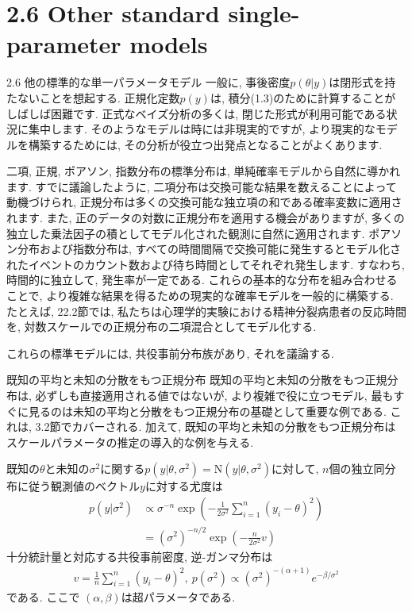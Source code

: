 \documentclass[10pt,dvipdfmx,a4]{beamer}
\newcommand{\eqn}[1]{\begin{align*}#1\end{align*}}
\begin{document}
\section{2.6 Other standard single-parameter models}
\begin{frame}{2.6 他の標準的な単一パラメータモデル}
一般に, 事後密度$p(\theta|y)$は閉形式を持たないことを想起する.
正規化定数$p(y)$は, 積分(1.3)のために計算することがしばしば困難です.
正式なベイズ分析の多くは, 閉じた形式が利用可能である状況に集中します.
そのようなモデルは時には非現実的ですが, より現実的なモデルを構築するためには, その分析が役立つ出発点となることがよくあります.

二項, 正規, ポアソン, 指数分布の標準分布は, 単純確率モデルから自然に導かれます.
すでに議論したように, 二項分布は交換可能な結果を数えることによって動機づけられ, 正規分布は多くの交換可能な独立項の和である確率変数に適用されます.
また, 正のデータの対数に正規分布を適用する機会がありますが, 多くの独立した乗法因子の積としてモデル化された観測に自然に適用されます.
ポアソン分布および指数分布は, すべての時間間隔で交換可能に発生するとモデル化されたイベントのカウント数および待ち時間としてそれぞれ発生します.
すなわち, 時間的に独立して, 発生率が一定である.
これらの基本的な分布を組み合わせることで, より複雑な結果を得るための現実的な確率モデルを一般的に構築する.
たとえば, 22.2節では, 私たちは心理学的実験における精神分裂病患者の反応時間を, 対数スケールでの正規分布の二項混合としてモデル化する.

これらの標準モデルには, 共役事前分布族があり, それを議論する.
\end{frame}


\begin{frame}{既知の平均と未知の分散をもつ正規分布}
既知の平均と未知の分散をもつ正規分布は, 必ずしも直接適用される値ではないが, より複雑で役に立つモデル, 最もすぐに見るのは未知の平均と分散をもつ正規分布の基礎として重要な例である.
これは, 3.2節でカバーされる.
加えて, 既知の平均と未知の分散をもつ正規分布はスケールパラメータの推定の導入的な例を与える.

既知の$\theta$と未知の$\sigma^2$に関する$p(y|\theta,\sigma^2)=\text{N}(y|\theta,\sigma^2)$に対して, $n$個の独立同分布に従う観測値のベクトル$y$に対する尤度は
\eqn{p(y|\sigma^2)&\propto \sigma^{-n}\exp\left(-\frac{1}{2\sigma^2}\sum_{i=1}^n(y_i-\theta)^2\right)\\
&=(\sigma^2)^{-n/2}\exp \left(-\frac{n}{2\sigma^2}v\right)}
十分統計量と対応する共役事前密度, 逆-ガンマ分布は
\eqn{v=\frac{1}{n}\sum_{i=1}^n(y_i-\theta)^2,\ p(\sigma^2)\propto (\sigma^2)^{-(\alpha+1)}e^{-\beta/\sigma^2}}
である.
ここで $(\alpha,\beta)$は超パラメータである.
\end{frame}
\end{document}
